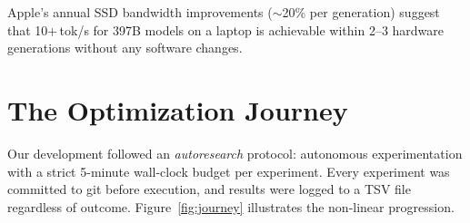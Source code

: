\documentclass[11pt,twocolumn]{article}
\begin{document}
Apple's annual SSD bandwidth improvements ($\sim$20\% per generation) suggest that 10+\,tok/s for 397B models on a laptop is achievable within 2--3 hardware generations without any software changes.

\section{The Optimization Journey}

Our development followed an \emph{autoresearch} protocol: autonomous experimentation with a strict 5-minute wall-clock budget per experiment.
Every experiment was committed to git before execution, and results were logged to a TSV file regardless of outcome.
Figure~\ref{fig:journey} illustrates the non-linear progression.
\end{document}
